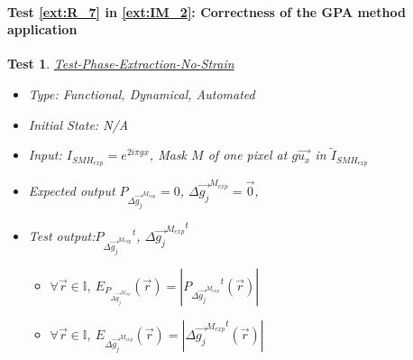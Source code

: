 \documentclass[12pt, titlepage]{article}
\newtheorem{Test}{Test}
\begin{document}
\paragraph{Test \cref{ext:R_7} in \cref{ext:IM_2}: Correctness of the GPA method application} 

\begin{Test}\normalfont\underline{Test-Phase-Extraction-No-Strain}
\label{T_Phase-Extraction-No-Strain}
\begin{itemize}
\item Type: Functional, Dynamical, Automated
\item Initial State: N/A
\item Input: $I_{SMH_{exp}}=e^{2i\pi gx}$, Mask $M$ of one pixel at $g\overrightarrow{u_x}$ in $\widetilde{I}_{SMH_{exp}}$
\item Expected output $P_{\Delta \overrightarrow{g_{j}}^{M_{exp}}}=0$, $\Delta \overrightarrow{g_{j}}^{M_{exp}}=\overrightarrow{0}$, 
\item Test output:${P_{\Delta \overrightarrow{g_{j}}^{M_{exp}}}}^{t}$, $\Delta {\overrightarrow{g_{j}}^{M_{exp}}}^{t}$
	\begin{itemize}
	\item $\forall \vec{r} \in \mathbb{I}, \ E_{P_{\Delta \overrightarrow{g_{j}}^{M_{exp}}}}(\vec{r})=|{P_{\Delta \overrightarrow{g_{j}}^{M_{exp}}}}^{t}(\vec{r})|$
	\item $\forall \vec{r} \in \mathbb{I}, \ E_{\Delta {\overrightarrow{g_{j}}^{M_{exp}}}}(\vec{r})=|{\Delta {\overrightarrow{g_{j}}^{M_{exp}}}}^t(\vec{r})|$
	\end{itemize}  
\end{itemize}
\end{Test}
\end{document}
